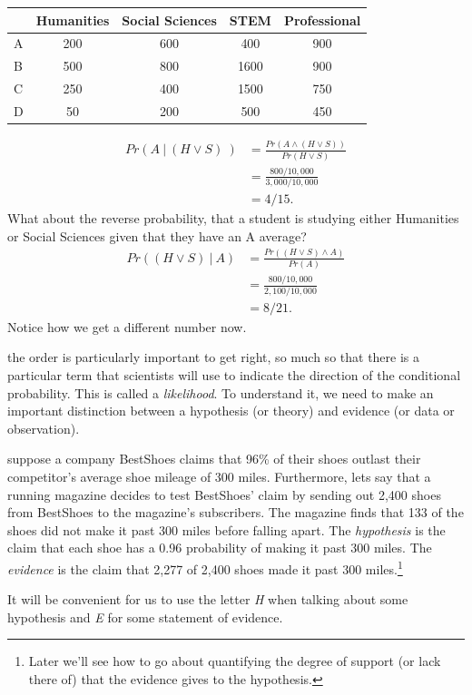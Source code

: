 \documentclass[]{tufte-book}
\begin{document}
\begin{longtable}[]{@{}lcccc@{}}
\toprule
& Humanities & Social Sciences & STEM & Professional\tabularnewline
\midrule
\endhead
A & 200 & 600 & 400 & 900\tabularnewline
B & 500 & 800 & 1600 & 900\tabularnewline
C & 250 & 400 & 1500 & 750\tabularnewline
D & 50 & 200 & 500 & 450\tabularnewline
\bottomrule
\end{longtable}

\[
  \begin{aligned}
    Pr(A ~ | ~(H \vee S)~) &= \frac{Pr(A \wedge (H \vee S))}{Pr(H \vee S)}\\
                           &= \frac{800/10,000}{3,000/10,000}\\
                           &= 4/15.
  \end{aligned}
\]
What about the reverse probability, that a student is studying either Humanities or Social Sciences given that they have an A average?
\[
  \begin{aligned}
    Pr((H \vee S) ~ | ~ A) &= \frac{Pr((H \vee S) \wedge A)}{Pr(A)}\\
                           &= \frac{800/10,000}{2,100/10,000}\\
                           &= 8/21.
  \end{aligned}
\]
Notice how we get a different number now.

 the order is particularly important to get right, so much so that there is a particular term that scientists will use to indicate the direction of the conditional probability. This is called a \emph{likelihood}. To understand it, we need to make an important distinction between a hypothesis (or theory) and evidence (or data or observation).

 suppose a company BestShoes claims that 96\% of their shoes outlast their competitor's average shoe mileage of 300 miles. Furthermore, lets say that a running magazine decides to test BestShoes' claim by sending out 2,400 shoes from BestShoes to the magazine's subscribers. The magazine finds that 133 of the shoes did not make it past 300 miles before falling apart. The \emph{hypothesis} is the claim that each shoe has a 0.96 probability of making it past 300 miles. The \emph{evidence} is the claim that 2,277 of 2,400 shoes made it past 300 miles.\footnote{Later we'll see how to go about quantifying the degree of support (or lack there of) that the evidence gives to the hypothesis.}

It will be convenient for us to use the letter \emph{H} when talking about some hypothesis and \emph{E} for some statement of evidence.
\end{document}
